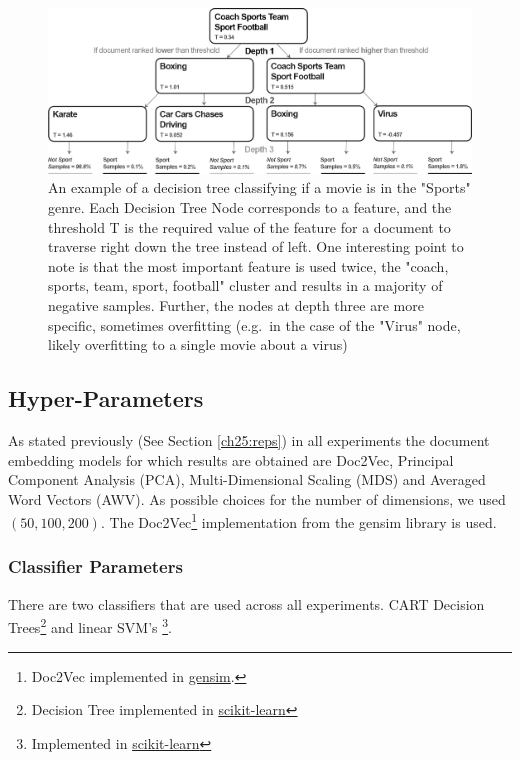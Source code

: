 \begin{figure}[t]
	\includegraphics[width=450px]{images/decision_tree_ex.png}
	\centering
	\caption{An example of a decision tree classifying if a movie is in the "Sports" genre. Each Decision Tree Node corresponds to a feature, and the threshold T is the required value of the feature for a document to traverse right down the tree instead of left. One interesting point to note is that the most important feature is used twice, the "coach, sports, team, sport, football" cluster and results in a majority of negative samples. Further, the nodes at depth three are more specific, sometimes overfitting (e.g.\ in the case of the "Virus" node, likely overfitting to a single movie about a virus) }\label{ch3:DecisionTree}
\end{figure}




\subsection{Hyper-Parameters}\label{ch3:hyperparam}

 As stated previously (See Section \ref{ch25:reps}) in all experiments the document embedding models for which results are obtained are Doc2Vec, Principal Component Analysis (PCA), Multi-Dimensional Scaling (MDS) and Averaged Word Vectors (AWV). As possible choices for the number of dimensions, we used $(50, 100, 200)$. The Doc2Vec\footnote{Doc2Vec implemented in \href{https://radimrehurek.com/gensim/models/doc2vec.html}{gensim}.} implementation from the gensim library is used. 

\subsubsection{Classifier Parameters}\label{ch3:classifierparmas}

There are two classifiers that are used across all experiments. CART Decision Trees\footnote{Decision Tree implemented in \href{https://scikit-learn.org/stable/modules/generated/sklearn.tree.DecisionTreeClassifier.html}{scikit-learn}} and linear SVM's \footnote{Implemented in \href{https://scikit-learn.org/stable/modules/generated/sklearn.tree.DecisionTreeClassifier.html}{scikit-learn}}.

